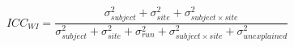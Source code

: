 \begin{equation}
ICC_{WI} = \frac{\sigma_{subject}^2 + \sigma_{site}^2 + \sigma_{subject \times site }^2 }{\sigma_{subject}^2+\sigma_{site}^2+\sigma_{run}^2+\sigma_{subject \times site}^2 + \sigma_{unexplained}^2}
\end{equation}
